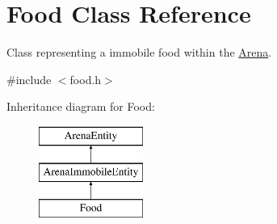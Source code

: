 \hypertarget{class_food}{}\section{Food Class Reference}
\label{class_food}


Class representing a immobile food within the \mbox{\hyperlink{class_arena}{Arena}}.  




{\ttfamily \#include $<$food.\+h$>$}

Inheritance diagram for Food\+:\begin{figure}[H]
\begin{center}
\leavevmode
\includegraphics[height=3.000000cm]{class_food}
\end{center}
\end{figure}
